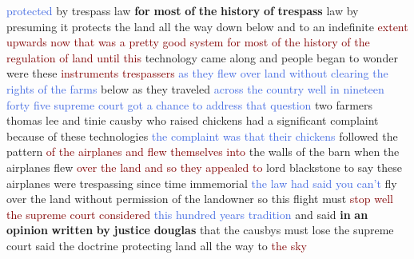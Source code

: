 \textcolor{RoyalBlue}{protected} by trespass law \textbf{for} \textbf{most} \textbf{of} \textbf{the} \textbf{history} \textbf{of} \textbf{trespass} law by presuming it protects the land all the way down below and to an indefinite \textcolor{Maroon}{extent} \textcolor{Maroon}{upwards} \textcolor{Maroon}{now} \textcolor{Maroon}{that} \textcolor{Maroon}{was} \textcolor{Maroon}{a} \textcolor{Maroon}{pretty} \textcolor{Maroon}{good} \textcolor{Maroon}{system} \textcolor{Maroon}{for} \textcolor{Maroon}{most} \textcolor{Maroon}{of} \textcolor{Maroon}{the} \textcolor{Maroon}{history} \textcolor{Maroon}{of} \textcolor{Maroon}{the} \textcolor{Maroon}{regulation} \textcolor{Maroon}{of} \textcolor{Maroon}{land} \textcolor{Maroon}{until} \textcolor{Maroon}{this} technology came along and people began to wonder were these \textcolor{Maroon}{instruments} \textcolor{Maroon}{trespassers} \textcolor{RoyalBlue}{as} \textcolor{RoyalBlue}{they} \textcolor{RoyalBlue}{flew} \textcolor{RoyalBlue}{over} \textcolor{RoyalBlue}{land} \textcolor{RoyalBlue}{without} \textcolor{RoyalBlue}{clearing} \textcolor{RoyalBlue}{the} \textcolor{RoyalBlue}{rights} \textcolor{RoyalBlue}{of} \textcolor{RoyalBlue}{the} \textcolor{RoyalBlue}{farms} below as they traveled \textcolor{RoyalBlue}{across} \textcolor{RoyalBlue}{the} \textcolor{RoyalBlue}{country} \textcolor{RoyalBlue}{well} \textcolor{RoyalBlue}{in} \textcolor{RoyalBlue}{nineteen} \textcolor{RoyalBlue}{forty} \textcolor{RoyalBlue}{five} \textcolor{RoyalBlue}{supreme} \textcolor{RoyalBlue}{court} \textcolor{RoyalBlue}{got} \textcolor{RoyalBlue}{a} \textcolor{RoyalBlue}{chance} \textcolor{RoyalBlue}{to} \textcolor{RoyalBlue}{address} \textcolor{RoyalBlue}{that} \textcolor{RoyalBlue}{question} two farmers thomas lee and tinie causby who raised chickens had a significant complaint because of these technologies \textcolor{RoyalBlue}{the} \textcolor{RoyalBlue}{complaint} \textcolor{RoyalBlue}{was} \textcolor{RoyalBlue}{that} \textcolor{RoyalBlue}{their} \textcolor{RoyalBlue}{chickens} followed the pattern \textcolor{Maroon}{of} \textcolor{Maroon}{the} \textcolor{Maroon}{airplanes} \textcolor{Maroon}{and} \textcolor{Maroon}{flew} \textcolor{Maroon}{themselves} \textcolor{Maroon}{into} the walls of the barn when the airplanes flew \textcolor{Maroon}{over} \textcolor{Maroon}{the} \textcolor{Maroon}{land} \textcolor{Maroon}{and} \textcolor{Maroon}{so} \textcolor{Maroon}{they} \textcolor{Maroon}{appealed} \textcolor{Maroon}{to} lord blackstone to say these airplanes were trespassing since time immemorial \textcolor{RoyalBlue}{the} \textcolor{RoyalBlue}{law} \textcolor{RoyalBlue}{had} \textcolor{RoyalBlue}{said} \textcolor{RoyalBlue}{you} \textcolor{RoyalBlue}{can't} fly over the land without permission of the landowner so this flight must \textcolor{Maroon}{stop} \textcolor{Maroon}{well} \textcolor{Maroon}{the} \textcolor{Maroon}{supreme} \textcolor{Maroon}{court} \textcolor{Maroon}{considered} \textcolor{RoyalBlue}{this} \textcolor{RoyalBlue}{hundred} \textcolor{RoyalBlue}{years} \textcolor{RoyalBlue}{tradition} and said \textbf{in} \textbf{an} \textbf{opinion} \textbf{written} \textbf{by} \textbf{justice} \textbf{douglas} that the causbys must lose the supreme court said the doctrine protecting land all the way to \textcolor{Maroon}{the} \textcolor{Maroon}{sky} 